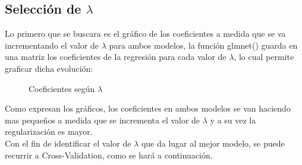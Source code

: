 \subsection{Selección de $\lambda$}


Lo primero que se buscara es el gráfico de los coeficientes a medida que se va incrementando el valor de $\lambda$ para ambos modelos, la función glmnet()\cite{glmnet} guarda en una matriz los coeficientes de la regresión para cada valor de $\lambda$, lo cual permite graficar dicha evolución:



\begin{figure}[h]
\centering
{}%
\hspace{0.25cm}%
\caption{Coeficientes según $\lambda$}
\label{coeficientes}
\end{figure}


Como expresan los gráficos, los coeficientes en ambos modelos se van haciendo mas pequeños a medida que se incrementa el valor de $\lambda$ y a su vez la regularización es mayor.\\
Con el fin de identificar el valor de $\lambda$ que da lugar al mejor modelo, se puede recurrir a Cross-Validation, como se hará a continuación.\\



